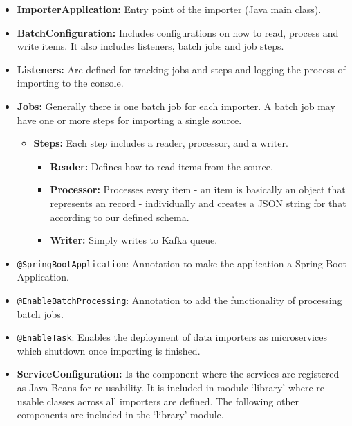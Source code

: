 \begin{itemize}
\tightlist
\item
  \textbf{ImporterApplication:} Entry point of the importer (Java main
  class).
\item
  \textbf{BatchConfiguration:} Includes configurations on how to read,
  process and write items. It also includes listeners, batch jobs and
  job steps.
\item
  \textbf{Listeners:} Are defined for tracking jobs and steps and
  logging the process of importing to the console.
\item
  \textbf{Jobs:} Generally there is one batch job for each importer. A batch job may have one or more steps for importing a single source.

	\begin{itemize}
		\item \textbf{Steps:} Each step includes a reader, processor, and a writer.

		\begin{itemize}
			\item \textbf{Reader:} Defines how to read items from the source.
			\item \textbf{Processor:} Processes every item - an item is basically an object that represents an record - individually and creates a JSON string for that according to our defined schema.
			\item \textbf{Writer:} Simply writes to Kafka queue.
		\end{itemize}

	\end{itemize}

\item
  \texttt{@SpringBootApplication}: Annotation to make the application a
  Spring Boot Application.
\item
  \texttt{@EnableBatchProcessing}: Annotation to add the functionality
  of processing batch jobs.
\item
  \texttt{@EnableTask}: Enables the deployment of data importers as
  microservices which shutdown once importing is finished.
\item
  \textbf{ServiceConfiguration:} Is the component where the services are
  registered as Java Beans for re-usability. It is included in module
  `library' where re-usable classes across all importers are defined.
  The following other components are included in the `library' module.


\end{itemize}
